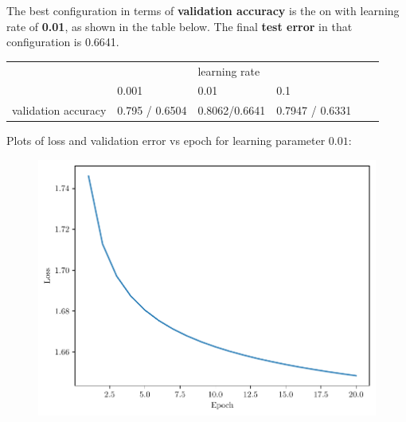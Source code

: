 \documentclass{exam}
\begin{document}
    \begin{questions}
        \question
        The best configuration in terms of \textbf{validation accuracy} is the on with learning rate of \textbf{0.01}, as shown in the table below. The final \textbf{test error} in that configuration is 0.6641.
         
        \begin{table}[h!]
            \centering
            \begin{tabular}{l|lllll}
                                &                                     & learning rate                      &                 &  &  \\ \cline{2-4}
                                & \multicolumn{1}{l|}{0.001}          & \multicolumn{1}{l|}{0.01}          & 0.1             &  &  \\ \cline{1-4}
            validation accuracy & \multicolumn{1}{l|}{0.795 / 0.6504} & \multicolumn{1}{l|}{0.8062/0.6641} & 0.7947 / 0.6331 &  & 
            \end{tabular}
        \end{table}
        Plots of loss and validation error vs epoch for learning parameter $0.01$:
        \begin{figure}[H]
            \centering
            \includegraphics[scale = 0.75]{logistic_regression-training-loss-0.01-sgd.pdf}
        \end{figure}


\end{questions}
\end{document}
